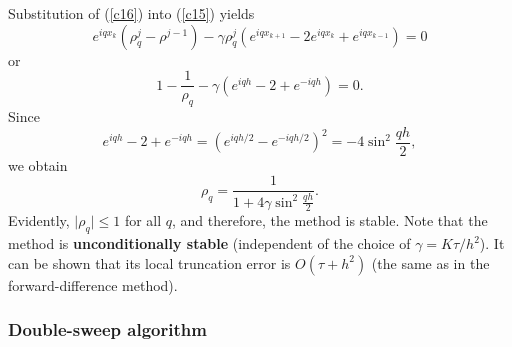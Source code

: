  
 
Substitution of (\ref{c16}) into (\ref{c15}) yields
\[
e^{iqx_{k}}\left(\rho_{q}^{j}-\rho^{j-1}\right)-
\gamma\rho_{q}^{j}\left(e^{iqx_{k+1}}-2e^{iqx_{k}}+e^{iqx_{k-1}}\right)=0
\]
or
\[
1-\frac{1}{\rho_{q}}-
\gamma\left(e^{iqh}-2+e^{-iqh}\right)=0.
\]
Since
\[
e^{iqh}-2+e^{-iqh}=\left(e^{iqh/2}-e^{-iqh/2}\right)^{2}=-4\sin^{2} \frac{qh}{2},
\]
we obtain
\[
\rho_{q}=\frac{1}{1+4\gamma\sin^{2} \frac{qh}{2}}.
\]
Evidently, $\vert\rho_{q}\vert\leq 1$ for all $q$, and therefore, the method is stable.
Note that the method is {\bf unconditionally stable} (independent
of the choice of $\gamma=K\tau/h^{2}$). It can be shown that
its local truncation
error is $O(\tau+h^{2})$ (the same as in the forward-difference method).

\subsubsection{Double-sweep algorithm}
 
